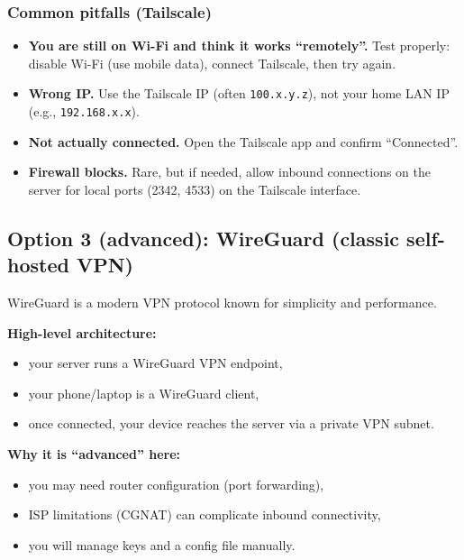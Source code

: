 \subsubsection*{Common pitfalls (Tailscale)}
\begin{itemize}[leftmargin=*]
  \item \textbf{You are still on Wi-Fi and think it works ``remotely''.}
  Test properly: disable Wi-Fi (use mobile data), connect Tailscale, then try again.
  \item \textbf{Wrong IP.} Use the Tailscale IP (often \texttt{100.x.y.z}), not your home LAN IP (e.g., \texttt{192.168.x.x}).
  \item \textbf{Not actually connected.} Open the Tailscale app and confirm ``Connected''.
  \item \textbf{Firewall blocks.} Rare, but if needed, allow inbound connections on the server for local ports (2342, 4533) on the Tailscale interface.
\end{itemize}

\subsection{Option 3 (advanced): WireGuard (classic self-hosted VPN)}
WireGuard is a modern VPN protocol known for simplicity and performance.

\textbf{High-level architecture:}
\begin{itemize}[leftmargin=*]
  \item your server runs a WireGuard VPN endpoint,
  \item your phone/laptop is a WireGuard client,
  \item once connected, your device reaches the server via a private VPN subnet.
\end{itemize}

\textbf{Why it is ``advanced'' here:}
\begin{itemize}[leftmargin=*]
  \item you may need router configuration (port forwarding),
  \item ISP limitations (CGNAT) can complicate inbound connectivity,
  \item you will manage keys and a config file manually.
\end{itemize}



